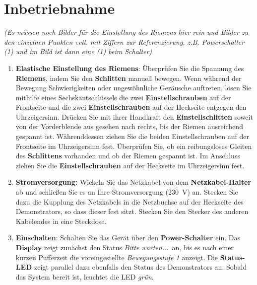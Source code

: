 %
%

\chapter{Inbetriebnahme}
	\textit{(Es müssen noch Bilder für die Einstellung des Riemens hier rein und Bilder zu den einzelnen Punkten evtl. mit Ziffern zur Referenzierung, z.B. Powerschalter (1) und im Bild ist dann eine (1) beim Schalter)}\\
\begin{enumerate} \label{STU}

	\item \textbf{Elastische Einstellung des Riemens}: Überprüfen Sie die Spannung des \textbf{Riemens}, indem Sie den \textbf{Schlitten} manuell bewegen. Wenn während der Bewegung Schwierigkeiten oder ungewöhnliche Geräusche auftreten, lösen Sie mithilfe eines Sechskantschlüssels die zwei \textbf{Einstellschrauben} auf der Frontseite und die zwei \textbf{Einstellschrauben} auf der Heckseite entgegen den Uhrzeigersinn. Drücken Sie mit ihrer Handkraft den \textbf{Einstellschlitten} soweit von der Vorderblende aus gesehen nach rechts, bis der Riemen ausreichend gespannt ist. Währenddessen ziehen Sie die beiden Einstellschrauben auf der Frontseite im Uhrzeigersinn fest. Überprüfen Sie, ob ein reibungsloses Gleiten des \textbf{Schlittens} vorhanden und ob der Riemen gespannt ist. Im Anschluss ziehen Sie die \textbf{Einstellschrauben} auf der Heckseite im Uhrzeigersinn fest. 
	
	\item \textbf{Stromversorgung:} Wickeln Sie das Netzkabel von dem \textbf{Netzkabel-Halter} ab und schließen Sie es an Ihre Stromversorgung (230\ V) an. Stecken Sie dazu die Kupplung des Netzkabels in die Netzbuchse auf der Heckseite des Demonstrators, so dass dieser fest sitzt. Stecken Sie den Stecker des anderen Kabelendes in eine Steckdose.
	
	\item \textbf{Einschalten}: Schalten Sie das Gerät über den \textbf{Power-Schalter} ein. Das \textbf{Display} zeigt zunächst den Status \glqq \textit{Bitte warten...}\grqq \ an, bis es nach einer kurzen Pufferzeit die voreingestellte \textit{\glqq Bewegungsstufe 1\grqq} anzeigt.
	Die \textbf{Status-LED} zeigt parallel dazu ebenfalls den Status des Demonstrators an. Sobald das System bereit ist, leuchtet die LED \textit{grün}.
\begin{center}	
\end{center}
\end{enumerate}
